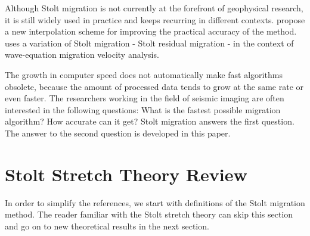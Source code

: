Although Stolt migration is not currently at the forefront of
geophysical research, it is still widely used in practice
\cite[]{yilmaz,yilmazLE} and keeps recurring in different contexts.
\cite{muir} propose a new interpolation scheme for improving the
practical accuracy of the method. \cite{sava} uses a variation of
Stolt migration - Stolt residual migration \cite[]{GEO61-02-06050607} -
in the context of wave-equation migration velocity analysis.

The growth in computer speed does not automatically make fast
algorithms obsolete, because the amount of processed data tends to
grow at the same rate or even faster. The researchers working in the
field of seismic imaging are often interested in the following
questions: What is the fastest possible migration algorithm?  How
accurate can it get? Stolt migration answers the first question.  The
answer to the second question is developed in this paper.

\section{Stolt Stretch Theory Review}

In order to simplify the references, we start with definitions of the
Stolt migration method. The reader familiar with the Stolt stretch
theory can skip this section and go on to new theoretical results in
the next section.


